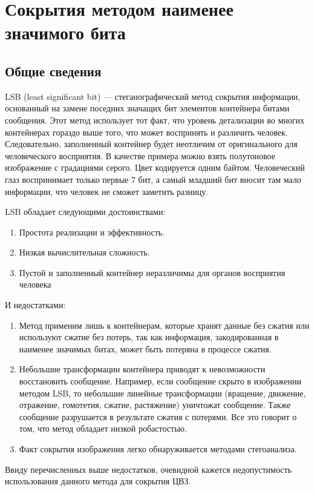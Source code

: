 \chapter{Сокрытия методом наименее значимого бита} %
\section{Общие сведения}
LSB (least significant bit) --- стеганографический метод сокрытия информации, основанный на замене поседних значащих бит
элементов контейнера битами сообщения. Этот метод использует тот факт,
что уровень детализации во многих контейнерах гораздо выше того,
что может воспринять и различить человек.
Следовательно, заполненный контейнер будет неотличим от оригинального
для человеческого восприятия. В качестве примера можно взять
полутоновое изображение с градациями серого. Цвет кодируется одним байтом.
Человеческий глаз воспринимает только первые 7 бит,
а самый младший бит вносит там мало информации, что человек не сможет заметить разницу.

LSB обладает следующими достоинствами:
\begin{enumerate}
    \item Простота реализации и эффективность.
    \item Низкая вычислительная сложность.
    \item Пустой и заполненный контейнер неразличимы для органов восприятия человека
\end{enumerate}
И недостатками:
\begin{enumerate}
    \item Метод применим лишь к контейнерам, которые хранят данные без сжатия или используют
    сжатие без потерь, так как информация, закодированная в наименее значимых битах, может
    быть потеряна в процессе сжатия.
    \item Небольшие трансформации контейнера приводят к невозможности восстановить сообщение.
    Например, если сообщение скрыто в изображении методом LSB, то небольшие линейные трансформации
    (вращение, движение, отражение, гомотетия, сжатие, растяжение) уничтожат сообщение. Также
    сообщение разрушается в результате сжатия с потерями. Все это говорит о том, что метод обладает
    низкой робастостью.
    \item Факт сокрытия изображения легко обнаруживается методами стегоанализа.
\end{enumerate}

Ввиду перечисленных выше недостатков, очевидной кажется недопустимость использования
данного метода для сокрытия ЦВЗ.

